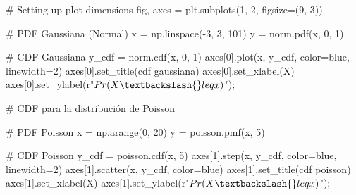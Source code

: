 \documentclass[
  letterpaper,
  DIV=11,
  numbers=noendperiod]{scrartcl}
\newenvironment{Shaded}{\begin{snugshade}}{\end{snugshade}}
\newcommand{\CommentTok}[1]{\textcolor[rgb]{0.37,0.37,0.37}{#1}}
\newcommand{\DecValTok}[1]{\textcolor[rgb]{0.68,0.00,0.00}{#1}}
\newcommand{\NormalTok}[1]{\textcolor[rgb]{0.00,0.23,0.31}{#1}}
\newcommand{\OperatorTok}[1]{\textcolor[rgb]{0.37,0.37,0.37}{#1}}
\newcommand{\StringTok}[1]{\textcolor[rgb]{0.13,0.47,0.30}{#1}}
\newcommand{\VerbatimStringTok}[1]{\textcolor[rgb]{0.13,0.47,0.30}{#1}}
\begin{document}
\begin{Shaded}
\begin{Highlighting}[]
\CommentTok{\# Setting up plot dimensions}
\NormalTok{fig, axes }\OperatorTok{=}\NormalTok{ plt.subplots(}\DecValTok{1}\NormalTok{, }\DecValTok{2}\NormalTok{, figsize}\OperatorTok{=}\NormalTok{(}\DecValTok{9}\NormalTok{, }\DecValTok{3}\NormalTok{))}

\CommentTok{\# PDF Gaussiana (Normal)}
\NormalTok{x }\OperatorTok{=}\NormalTok{ np.linspace(}\OperatorTok{{-}}\DecValTok{3}\NormalTok{, }\DecValTok{3}\NormalTok{, }\DecValTok{101}\NormalTok{)}
\NormalTok{y }\OperatorTok{=}\NormalTok{ norm.pdf(x, }\DecValTok{0}\NormalTok{, }\DecValTok{1}\NormalTok{)}

\CommentTok{\# CDF Gaussiana}
\NormalTok{y\_cdf }\OperatorTok{=}\NormalTok{ norm.cdf(x, }\DecValTok{0}\NormalTok{, }\DecValTok{1}\NormalTok{)}
\NormalTok{axes[}\DecValTok{0}\NormalTok{].plot(x, y\_cdf, color}\OperatorTok{=}\StringTok{\textquotesingle{}blue\textquotesingle{}}\NormalTok{, linewidth}\OperatorTok{=}\DecValTok{2}\NormalTok{)}
\NormalTok{axes[}\DecValTok{0}\NormalTok{].set\_title(}\StringTok{\textquotesingle{}cdf gaussiana\textquotesingle{}}\NormalTok{)}
\NormalTok{axes[}\DecValTok{0}\NormalTok{].set\_xlabel(}\StringTok{\textquotesingle{}X\textquotesingle{}}\NormalTok{)}
\NormalTok{axes[}\DecValTok{0}\NormalTok{].set\_ylabel(}\VerbatimStringTok{r"$Pr(X \textbackslash{}leq x)$"}\NormalTok{)}\OperatorTok{;}

\CommentTok{\# CDF para la distribución de Poisson}

\CommentTok{\# PDF Poisson}
\NormalTok{x }\OperatorTok{=}\NormalTok{ np.arange(}\DecValTok{0}\NormalTok{, }\DecValTok{20}\NormalTok{)}
\NormalTok{y }\OperatorTok{=}\NormalTok{ poisson.pmf(x, }\DecValTok{5}\NormalTok{)}

\CommentTok{\# CDF Poisson}
\NormalTok{y\_cdf }\OperatorTok{=}\NormalTok{ poisson.cdf(x, }\DecValTok{5}\NormalTok{)}
\NormalTok{axes[}\DecValTok{1}\NormalTok{].step(x, y\_cdf, color}\OperatorTok{=}\StringTok{\textquotesingle{}blue\textquotesingle{}}\NormalTok{, linewidth}\OperatorTok{=}\DecValTok{2}\NormalTok{)}
\NormalTok{axes[}\DecValTok{1}\NormalTok{].scatter(x, y\_cdf, color}\OperatorTok{=}\StringTok{\textquotesingle{}blue\textquotesingle{}}\NormalTok{)}
\NormalTok{axes[}\DecValTok{1}\NormalTok{].set\_title(}\StringTok{\textquotesingle{}cdf poisson\textquotesingle{}}\NormalTok{)}
\NormalTok{axes[}\DecValTok{1}\NormalTok{].set\_xlabel(}\StringTok{\textquotesingle{}X\textquotesingle{}}\NormalTok{)}
\NormalTok{axes[}\DecValTok{1}\NormalTok{].set\_ylabel(}\VerbatimStringTok{r"$Pr(X \textbackslash{}leq x)$"}\NormalTok{)}\OperatorTok{;}

\end{Highlighting}
\end{Shaded}
\end{document}
